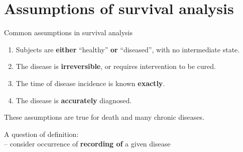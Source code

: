 \section{Assumptions of survival analysis}

\begin{frame}{Common assumptions in survival analysis}
    \begin{enumerate}
    \item Subjects are \textbf{either} ``healthy'' \textbf{or}
      ``diseased'', with no intermediate state.
    \item The disease is \textbf{irreversible}, or requires
      intervention to be cured.
    \item The time of disease incidence is known \textbf{exactly}.
    \item The disease is \textbf{accurately} diagnosed.
    \end{enumerate}
    \pause
    These assumptions are true for \alert{death} and many
    \alert{chronic diseases}.
    \pause
    
    A question of definition:\\ -- consider occurrence of \textbf{recording of} a
    given disease
\end{frame}


